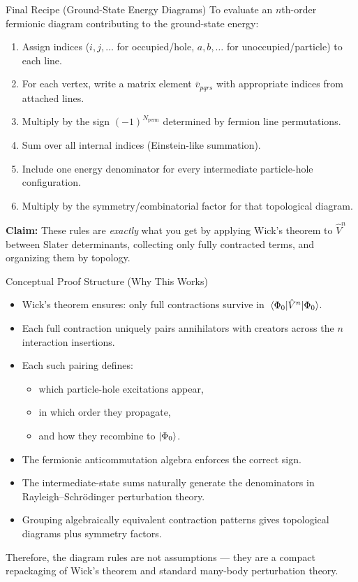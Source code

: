 \documentclass[aspectratio=169]{beamer}
\begin{document}
\begin{frame}{Final Recipe (Ground-State Energy Diagrams)}
To evaluate an $n$th-order fermionic diagram contributing to the
ground-state energy:
\begin{enumerate}
    \item Assign indices ($i,j,\dots$ for occupied/hole,
          $a,b,\dots$ for unoccupied/particle) to each line.
    \item For each vertex, write a matrix element $\bar{v}_{pqrs}$
          with appropriate indices from attached lines.
    \item Multiply by the sign $(-1)^{N_{\text{perm}}}$ determined by
          fermion line permutations.
    \item Sum over all internal indices (Einstein-like summation).
    \item Include one energy denominator for every intermediate
          particle-hole configuration.
    \item Multiply by the symmetry/combinatorial factor for that
          topological diagram.
\end{enumerate}

\bigskip
\textbf{Claim:} These rules are \emph{exactly} what you get by
applying Wick’s theorem to $\hat{V}^n$ between Slater determinants,
collecting only fully contracted terms, and organizing them by
topology.
\end{frame}

\begin{frame}{Conceptual Proof Structure (Why This Works)}
\begin{itemize}
    \item Wick's theorem ensures: only full contractions survive in
    $\mel{\Phi_0}{\hat{V}^n}{\Phi_0}$.
    \item Each full contraction uniquely pairs annihilators with
    creators across the $n$ interaction insertions.
    \item Each such pairing defines:
        \begin{itemize}
            \item which particle-hole excitations appear,
            \item in which order they propagate,
            \item and how they recombine to $\ket{\Phi_0}$.
        \end{itemize}
    \item The fermionic anticommutation algebra enforces the correct sign.
    \item The intermediate-state sums naturally generate the
    denominators in Rayleigh--Schr\"odinger perturbation theory.
    \item Grouping algebraically equivalent contraction patterns
    gives topological diagrams plus symmetry factors.
\end{itemize}

Therefore, the diagram rules are not assumptions --- they are a compact
repackaging of Wick's theorem and standard many-body perturbation theory.
\end{frame}
\end{document}
